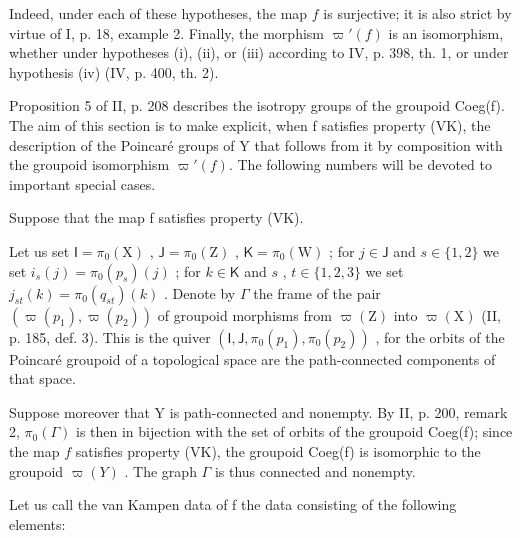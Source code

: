 Indeed, under each of these hypotheses, the map \(f\) is surjective; it is also strict by virtue of I, p. 18, example 2. Finally, the morphism \(\varpi'(f)\) is an isomorphism, whether under hypotheses (i), (ii), or (iii) according to IV, p. 398, th. 1, or under hypothesis (iv) (IV, p. 400, th. 2).

Proposition 5 of II, p. 208 describes the isotropy groups of the groupoid Coeg(f). The aim of this section is to make explicit, when f satisfies property (VK), the description of the Poincaré groups of Y that follows from it by composition with the groupoid isomorphism \(\varpi'(f)\). The following numbers will be devoted to important special cases.

Suppose that the map f satisfies property (VK).

Let us set \(\mathsf{I} = \pi_0(\mathrm{X})\) , \(\mathsf{J} = \pi_0(\mathrm{Z})\) , \(\mathsf{K} = \pi_0(\mathrm{W})\) ; for \(j \in \mathsf{J}\) and \(s \in \{1,2\}\) we set \(i_s(j) = \pi_0(p_s)(j)\) ; for \(k \in \mathsf{K}\) and \(s\) , \(t \in \{1,2,3\}\) we set \(j_{st}(k) = \pi_0(q_{st})(k)\) . Denote by \(\Gamma\) the frame of the pair \((\varpi(p_1), \varpi(p_2))\) of groupoid morphisms from \(\varpi(\mathrm{Z})\) into \(\varpi(\mathrm{X})\) (II, p. 185, def. 3). This is the quiver \((\mathsf{I}, \mathsf{J}, \pi_0(p_1), \pi_0(p_2))\) , for the orbits of the Poincaré groupoid of a topological space are the path-connected components of that space.

Suppose moreover that Y is path-connected and nonempty. By II, p. 200, remark 2, \(\pi_0(\Gamma)\) is then in bijection with the set of orbits of the groupoid Coeg(f); since the map \(f\) satisfies property (VK), the groupoid Coeg(f) is isomorphic to the groupoid \(\varpi(Y)\) . The graph \(\Gamma\) is thus connected and nonempty.

Let us call the van Kampen data of f the data consisting of the following elements:

